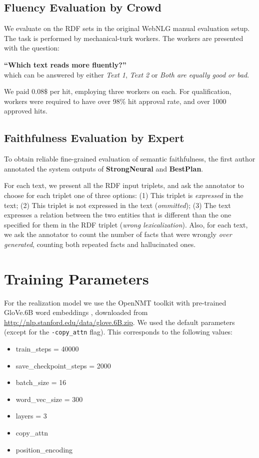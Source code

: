 \documentclass[11pt,a4paper]{article}
\newcommand\ourplans[0]{BestPlan}
\newcommand\ourbaseline[0]{StrongNeural}
\begin{document}
\subsection{Fluency Evaluation by Crowd}\label{app:manual:turk}
We evaluate on the RDF sets in the original WebNLG manual evaluation setup. The task is performed by mechanical-turk workers. The workers are presented with the question:

\textbf{``Which text reads more fluently?''} \\
which can be answered by either \emph{Text 1}, \emph{Text 2} or \emph{Both are equally good or bad}.

We paid $0.08\$$ per hit, employing three workers on each. For qualification, workers were required to have over 98\% hit approval rate, and over 1000 approved hits. 

\subsection{Faithfulness Evaluation by Expert}\label{app:manual:expert}
To obtain reliable fine-grained evaluation of semantic faithfulness, the first author annotated the system outputs of \textbf{\ourbaseline} and \textbf{\ourplans}.
    
For each text, we present all the RDF input triplets, and ask the annotator to choose for each triplet one of three options: (1) This triplet is \textit{expressed} in the text; (2) This triplet is not expressed in the text (\textit{ommitted}); (3) The text expresses a relation between the two entities that is different than the one specified for them in the RDF triplet (\textit{wrong lexicalization}). Also, for each text, we ask the annotator to count the number of facts that were wrongly \textit{over generated}, counting both repeated facts and hallucinated ones.

\section{Training Parameters}
For the realization model we use the OpenNMT toolkit \cite{klein2017opennmt} with pre-trained GloVe.6B word embeddings \cite{pennington2014glove}, downloaded from \url{http://nlp.stanford.edu/data/glove.6B.zip}. We used the default parameters (except for the \texttt{-copy\_attn} flag). This corresponds to the following values:
\begin{itemize}
    \item train\_steps = 40000
    \item save\_checkpoint\_steps = 2000
    \item batch\_size = 16
    \item word\_vec\_size = 300
    \item layers = 3
    \item copy\_attn
    \item position\_encoding
\end{itemize}

\clearpage



\end{document}
